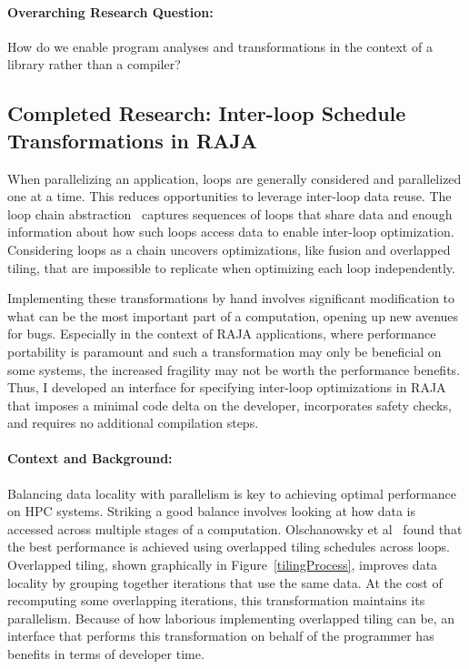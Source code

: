 \documentclass{article}
\begin{document}
\paragraph{Overarching Research Question:} How do we enable program analyses and transformations in the context of a library rather than a compiler?

\subsection{Completed Research: Inter-loop Schedule Transformations in RAJA}
\label{Sec:Work1}
When parallelizing an application, loops are generally considered and
parallelized one at a time.
This reduces opportunities to leverage inter-loop data reuse.
The loop chain abstraction~\cite{krieger2013loop} captures sequences of loops that share 
data and enough information about how such loops access 
data to enable inter-loop optimization.
Considering loops as a chain uncovers optimizations, like fusion
and overlapped tiling, that are impossible to replicate when optimizing
each loop independently.

Implementing these transformations by hand involves significant modification to what can be the most important part of a computation, opening up new avenues for bugs. 
Especially in the context of RAJA applications, where performance portability is paramount and such a transformation may only be beneficial on some systems, the increased fragility may not be worth the performance benefits. 
Thus, I developed an interface for specifying inter-loop optimizations in RAJA that imposes a minimal code delta on the developer, incorporates safety checks, and requires no additional compilation steps. 

\paragraph{Context and Background:}

Balancing data locality with parallelism is key to achieving optimal performance on HPC systems. 
Striking a good balance involves looking at how data is accessed across multiple stages of a computation.
Olschanowsky et al~\cite{olschanowsky2014study} found that the best performance is achieved using overlapped tiling schedules across loops. 
Overlapped tiling, shown graphically in Figure~\ref{tilingProcess}, improves data locality by grouping together iterations that use the same data.
At the cost of recomputing some overlapping iterations, this transformation maintains its parallelism.
Because of how laborious implementing overlapped tiling can be, an interface that performs this transformation on behalf of the programmer has benefits in terms of developer time. 
\end{document}
